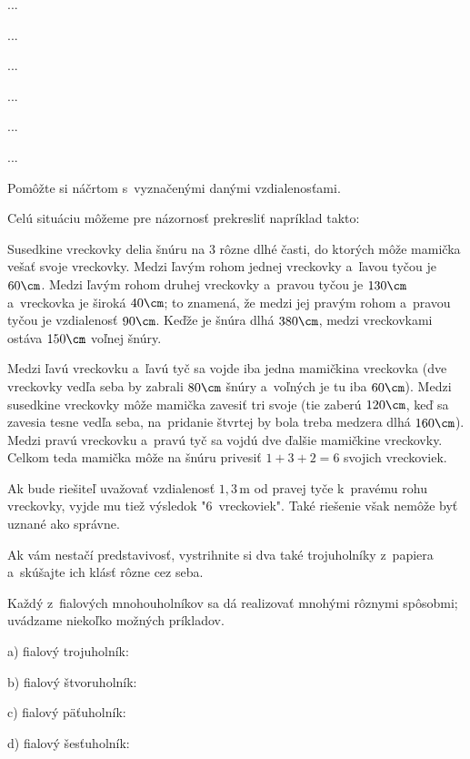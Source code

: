 ﻿{%
...}

{%
...}

{%
...}

{%
...}

{%
...}

{%
...}

{%
\napad
Pomôžte si náčrtom s~vyznačenými danými vzdialenosťami.

\riesenie
Celú situáciu môžeme pre názornosť prekresliť napríklad takto:
%

Susedkine vreckovky delia šnúru na 3 rôzne dlhé časti, do ktorých
môže mamička vešať svoje vreckovky. Medzi ľavým rohom jednej vreckovky
a~ľavou tyčou je $60\cm$. Medzi ľavým rohom druhej vreckovky a~pravou
tyčou je $130\cm$ a~vreckovka je široká $40\cm$; to znamená, že medzi jej
pravým rohom a~pravou tyčou je vzdialenosť $90\cm$. Keďže je šnúra
dlhá $380\cm$, medzi vreckovkami ostáva $150\cm$ voľnej šnúry.

Medzi ľavú vreckovku a~ľavú tyč sa vojde iba jedna mamičkina vreckovka
(dve vreckovky vedľa seba by zabrali $80\cm$ šnúry a~voľných je tu
iba $60\cm$). Medzi susedkine vreckovky môže mamička zavesiť tri svoje
(tie zaberú $120\cm$, keď sa zavesia tesne vedľa seba, na~pridanie
štvrtej by bola treba medzera dlhá $160\cm$). Medzi pravú vreckovku
a~pravú tyč sa vojdú dve ďalšie mamičkine vreckovky. Celkom teda
mamička môže na šnúru privesiť $1+3+2=6$ svojich vreckoviek.

\poznamka
Ak bude riešiteľ uvažovať vzdialenosť $1{,}3\,\text{m}$ od pravej tyče k~pravému
rohu vreckovky, vyjde mu tiež výsledok "6~vreckoviek". Také riešenie
však nemôže byť uznané ako správne.
}

{%
\napad
Ak vám nestačí predstavivosť, vystrihnite si dva také trojuholníky
z~papiera a~skúšajte ich klásť rôzne cez seba.

\riesenie
Každý z~fialových mnohouholníkov sa dá realizovať mnohými rôznymi spôsobmi;
uvádzame niekoľko možných príkladov.

a) fialový trojuholník:
%

b) fialový štvoruholník:
%

c) fialový päťuholník:
%

d) fialový šesťuholník:
%
}

